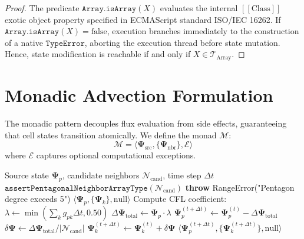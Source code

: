 \documentclass[10pt,journal,compsoc]{IEEEtran}
\begin{document}
\begin{proof}
The predicate $\texttt{Array.isArray}(X)$ evaluates the internal $[[\text{Class}]]$ exotic object property specified in ECMAScript standard ISO/IEC 16262. If $\texttt{Array.isArray}(X) = \text{false}$, execution branches immediately to the construction of a native $\texttt{TypeError}$, aborting the execution thread before state mutation. Hence, state modification is reachable if and only if $X \in \mathcal{T}_{\text{Array}}$.
\end{proof}

\section{Monadic Advection Formulation}

The monadic pattern decouples flux evaluation from side effects, guaranteeing that cell states transition atomically. We define the monad $\mathcal{M}$:
\begin{equation}
\mathcal{M} = \langle \mathbf{\Psi}_{\text{src}}, \{\mathbf{\Psi}_{\text{nbr}}\}, \mathcal{E} \rangle
\end{equation}
where $\mathcal{E}$ captures optional computational exceptions.

\begin{algorithm}
\caption{Conservative Pentagonal Advection Step}
\begin{algorithmic}[1]
\REQUIRE Source state $\mathbf{\Psi}_p$, candidate neighbors $\mathcal{N}_{\text{cand}}$, time step $\Delta t$
\STATE $\texttt{assertPentagonalNeighborArrayType}(\mathcal{N}_{\text{cand}})$
    \STATE \textbf{throw} RangeError("Pentagon degree exceeds 5")
\ENDIF
{}
    \RETURN $\langle \mathbf{\Psi}_p, \{\mathbf{\Psi}_k\}, \text{null} \rangle$
\ENDIF
\STATE Compute CFL coefficient: $\lambda \leftarrow \min(\sum_k g_{pk} \Delta t, 0.50)$
\STATE $\Delta \mathbf{\Psi}_{\text{total}} \leftarrow \mathbf{\Psi}_p \cdot \lambda$
\STATE $\mathbf{\Psi}_p^{(t+\Delta t)} \leftarrow \mathbf{\Psi}_p^{(t)} - \Delta \mathbf{\Psi}_{\text{total}}$
\STATE $\delta \mathbf{\Psi} \leftarrow \Delta \mathbf{\Psi}_{\text{total}} / |\mathcal{N}_{\text{cand}}|$
    \STATE $\mathbf{\Psi}_k^{(t+\Delta t)} \leftarrow \mathbf{\Psi}_k^{(t)} + \delta \mathbf{\Psi}$
\ENDFOR
\RETURN $\langle \mathbf{\Psi}_p^{(t+\Delta t)}, \{\mathbf{\Psi}_k^{(t+\Delta t)}\}, \text{null} \rangle$
\end{algorithmic}
\end{algorithm}
\end{document}
